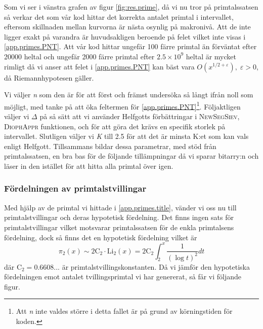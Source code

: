 Som vi ser i vänstra grafen av figur \ref{fig:res.prime}, då vi nu tror på primtalssatsen så verkar det som vår kod hittar det korrekta antalet primtal i intervallet, eftersom skillnaden mellan kurvorna är nästa osynlig på makronivå. 
Att de inte ligger exakt på varandra är huvudsakligen beroende på felet vilket inte visas i \eqref{app.primes.PNT}.
Att vår kod hittar ungefär 100 färre primtal än förväntat efter 20000 heltal och ungefär 2000 färre primtal efter \(2.5\times10^9\) heltal är mycket rimligt då vi anser att felet i \eqref{app.primes.PNT} kan bäst vara \(O(x^{1/2 + \varepsilon}),\; \varepsilon > 0\), då Riemannhypotesen gäller.

Vi väljer \textit{n} som den är för att först och främst undersöka så långt ifrån noll som möjligt, med tanke på att öka feltermen för \eqref{app.primes.PNT}\footnote{Att \textit{n} inte valdes större i detta fallet är på grund av körningstiden för koden.}.
Följaktligen väljer vi \(\Delta\) på så sätt att vi använder Helfgotts förbättringar i \textsc{NewSegSiev}, \textsc{DiophAppr} funktionen, och för att göra det krävs en specifik storlek på intervallet.
Slutligen väljer vi \textit{K} till 2.5 för att det är minsta K:et som kan vals enligt Helfgott.
Tillsammans bildar dessa parametrar, med stöd från primtalssatsen, en bra bas för de följande tillämpningar då vi sparar bitarry:n och läser in den istället för att hitta alla primtal över igen.

\subsubsection{Fördelningen av primtalstvillingar}

Med hjälp av de primtal vi hittade i \ref{app.primes.title}, vänder vi oss nu till primtalstvillingar och deras hypotetisk fördelning. Det finns ingen sats för primtalstvillingar vilket motsvarar primtalssatsen för de enkla primtalsens fördelning, dock så finns det en hypotetisk fördelning vilket är
\begin{equation}
    \pi_2(x) \sim 2\text{C}_2\cdot \text{Li}_2(x) = 2\text{C}_2\int_2^x\frac{1}{(\log t)^2}dt\label{app.twins.TWN}
\end{equation}
där \(\text{C}_2 = 0.6608...\) är primtalstvillingskonstanten. Då vi jämför den hypotetiska fördelningen emot antalet tvillingsprimtal vi har genererat, så får vi följande figur.

